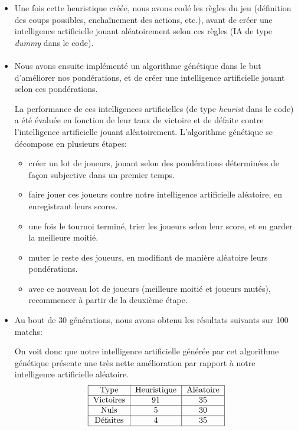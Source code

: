 \documentclass[10pt, french]{article}
\begin{document}
\begin{itemize}
\paragraph{}
\item Une fois cette heuristique créée, nous avons codé les règles du jeu (définition des coups possibles, enchaînement des actions, etc.), avant de créer une intelligence artificielle jouant aléatoirement selon ces règles (IA de type \textit{dummy} dans le code). 
\paragraph{}
\item Nous avons ensuite implémenté un algorithme génétique dans le but d'améliorer nos pondérations, et de créer une intelligence artificielle jouant selon ces pondérations. \\
\par La performance de ces intelligences artificielles (de type \textit{heurist} dans le code) a été évaluée en fonction de leur taux de victoire et de défaite contre l'intelligence artificielle jouant aléatoirement. 
L'algorithme génétique se décompose en plusieurs étapes: 
\begin{itemize}
    \item créer un lot de joueurs, jouant selon des pondérations déterminées de façon subjective dans un premier temps. 
    \item faire jouer ces joueurs contre notre intelligence artificielle aléatoire, en enregistrant leurs scores. 
    \item une fois le tournoi terminé, trier les joueurs selon leur score, et en garder la meilleure moitié. 
    \item muter le reste des joueurs, en modifiant de manière aléatoire leurs pondérations. 
    \item avec ce nouveau lot de joueurs (meilleure moitié et joueurs mutés), recommencer à partir de la deuxième étape.   
\end{itemize}

\item Au bout de 30 générations, nous avons obtenu les résultats suivants sur 100 matchs: 

On voit donc que notre intelligence artificielle générée par cet algorithme génétique présente une très nette amélioration par rapport à notre intelligence artificielle aléatoire.
$$
\begin{tabular}{ |c|c|c| }
\hline
Type & Heuristique & Aléatoire\\
\hline
Victoires & 91 & 35 \\
\hline
Nuls & 5 & 30 \\
\hline
 Défaites  & 4 & 35 \\
 \hline
\end{tabular}
$$
\\ 


\end{itemize}
\end{document}
